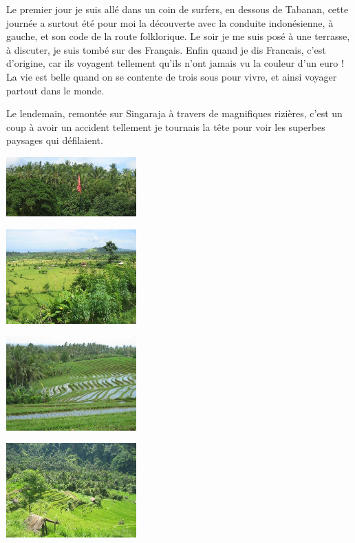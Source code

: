 \begin{multicols}{2}
Le premier jour je suis allé dans un coin de surfers, en dessous de Tabanan, cette journée a surtout été pour moi la découverte avec la conduite indonésienne, à gauche, et son code de la route folklorique. Le soir je me suis posé à une terrasse, à discuter, je suis tombé sur des Français. Enfin quand je dis Francais, c'est d'origine, car ils voyagent tellement qu'ils n'ont jamais vu la couleur d'un euro ! La vie est belle quand on se contente de trois sous pour vivre, et ainsi voyager partout dans le monde.

Le lendemain, remontée sur Singaraja à travers de magnifiques rizières, c'est un coup à avoir un accident tellement je tournais la tête pour voir les superbes paysages qui défilaient.

\smallbreak
\hspace*{-0.65cm}
\includegraphics[width=5cm]{articles/Round-trip-in-bali/1208257309URc4.jpg}
\smallbreak

\smallbreak
\hspace*{-0.65cm}
\includegraphics[width=5cm]{articles/Round-trip-in-bali/1208257304SP22.jpg}
\smallbreak

\smallbreak
\hspace*{-0.65cm}
\includegraphics[width=5cm]{articles/Round-trip-in-bali/1208257308isJF.jpg}
\smallbreak

\smallbreak
\hspace*{-0.65cm}
\includegraphics[width=5cm]{articles/Round-trip-in-bali/1208257307G9b6.jpg}
\smallbreak


\end{multicols}
